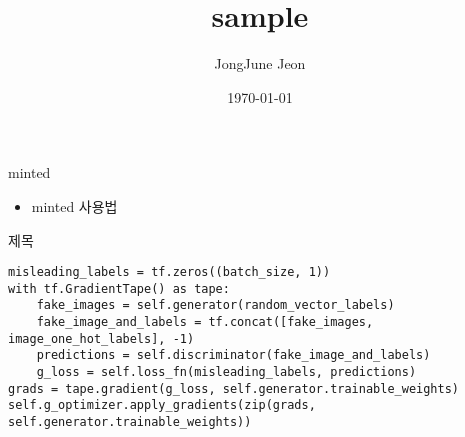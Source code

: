 \documentclass[10pt]{beamer}
\title[] %
{sample}
\subtitle
{} %
\author[ ] %
{JongJune Jeon\inst{1}}
\institute[Universities of Somewhere and Elsewhere] %
{
    \inst{1}%
    Dept. of Statistics,\\
    University of Seoul,\\
    S. Korea
}
\date[Short Occasion] %
{\today}
\newcommand{\bed}{\begin{itemize}}
\newcommand{\eed}{\end{itemize}}
\begin{document}
\begin{frame}
  \titlepage
\end{frame}

\begin{frame}{minted}
\bed
    \item minted 사용법
\eed
\end{frame}

\begin{frame}[fragile]{제목}
\begin{verbatim}
misleading_labels = tf.zeros((batch_size, 1))
with tf.GradientTape() as tape:
    fake_images = self.generator(random_vector_labels)
    fake_image_and_labels = tf.concat([fake_images, image_one_hot_labels], -1)
    predictions = self.discriminator(fake_image_and_labels)
    g_loss = self.loss_fn(misleading_labels, predictions)
grads = tape.gradient(g_loss, self.generator.trainable_weights)
self.g_optimizer.apply_gradients(zip(grads, self.generator.trainable_weights))
\end{verbatim}
\end{frame}
\end{document}

